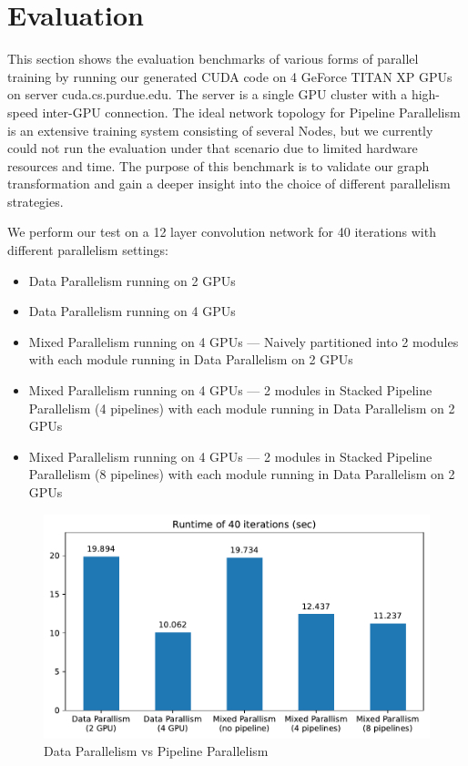 \documentclass[sigplan, nonacm]{acmart}\settopmatter{printfolios=true,printccs=false,printacmref=false}
\begin{document}
 \section{Evaluation}\label{evaluation}
 This section shows the evaluation benchmarks of various forms of parallel training by running our generated CUDA code on 4 GeForce TITAN XP GPUs on server cuda.cs.purdue.edu. The server is a single GPU cluster with a high-speed inter-GPU connection. The ideal network topology for Pipeline Parallelism is an extensive training system consisting of several Nodes, but we currently could not run the evaluation under that scenario due to limited hardware resources and time. The purpose of this benchmark is to validate our graph transformation and gain a deeper insight into the choice of different parallelism strategies.\par
 We perform our test on a 12 layer convolution network for 40 iterations with different parallelism settings:
 \begin{itemize}
   \item Data Parallelism running on 2 GPUs
   \item Data Parallelism running on 4 GPUs
   \item Mixed Parallelism running on 4 GPUs --- Naively partitioned into 2 modules with each module running in Data Parallelism on 2 GPUs
   \item Mixed Parallelism running on 4 GPUs --- 2 modules in Stacked Pipeline Parallelism (4 pipelines) with each module running in Data Parallelism on 2 GPUs
   \item Mixed Parallelism running on 4 GPUs --- 2 modules in Stacked Pipeline Parallelism (8 pipelines) with each module running in Data Parallelism on 2 GPUs
 \end{itemize}
 \begin{figure}[htbp]
  \centering
  \includegraphics[scale=0.5]{pipelineparallelruntime.pdf}
  \caption{Data Parallelism vs Pipeline Parallelism}
  \label{fig:runtime}
\end{figure}
\end{document}
